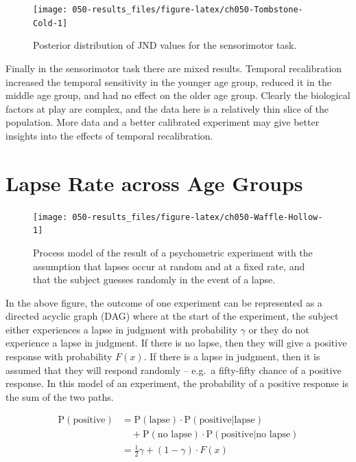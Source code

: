 \documentclass[11pt, oneside, openany]{scrbook}
\begin{document}
\begin{figure}

{\centering \texttt{[image: 050-results\_files/figure-latex/ch050-Tombstone-Cold-1]} 

}

\caption{Posterior distribution of JND values for the sensorimotor task.}\label{fig:ch050-Tombstone-Cold}
\end{figure}

Finally in the sensorimotor task there are mixed results. Temporal recalibration increased the temporal sensitivity in the younger age group, reduced it in the middle age group, and had no effect on the older age group. Clearly the biological factors at play are complex, and the data here is a relatively thin slice of the population. More data and a better calibrated experiment may give better insights into the effects of temporal recalibration.

\hypertarget{lapse-rate-across-age-groups}{%
\section{Lapse Rate across Age Groups}\label{lapse-rate-across-age-groups}}

\begin{figure}

{\centering \texttt{[image: 050-results\_files/figure-latex/ch050-Waffle-Hollow-1]} 

}

\caption{Process model of the result of a psychometric experiment with the assumption that lapses occur at random and at a fixed rate, and that the subject guesses randomly in the event of a lapse.}\label{fig:ch050-Waffle-Hollow}
\end{figure}

In the above figure, the outcome of one experiment can be represented as a directed acyclic graph (DAG) where at the start of the experiment, the subject either experiences a lapse in judgment with probability \(\gamma\) or they do not experience a lapse in judgment. If there is no lapse, then they will give a positive response with probability \(F(x)\). If there is a lapse in judgment, then it is assumed that they will respond randomly -- e.g.~a fifty-fifty chance of a positive response. In this model of an experiment, the probability of a positive response is the sum of the two paths.

\begin{align*}
\mathrm{P}(\textrm{positive}) &= 
  \mathrm{P}(\textrm{lapse}) \cdot \mathrm{P}(\textrm{positive} | \textrm{lapse}) \\
  &\quad + \mathrm{P}(\textrm{no lapse}) \cdot \mathrm{P}(\textrm{positive} | \textrm{no lapse}) \\
  &= \frac{1}{2} \gamma + (1 - \gamma) \cdot F(x)
\end{align*}
\end{document}
